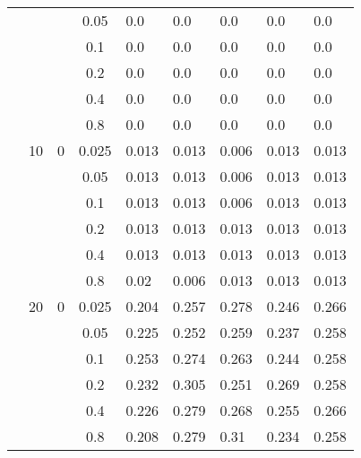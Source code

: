 \begin{longtable}{|l|l|l|c|l|l|l|l|l|}
\cmidrule{4-9} &     &          & 0.05           & 0.0        & 0.0        & 0.0        & 0.0        & 0.0        \\
\cmidrule{4-9} &     &          & 0.1            & 0.0        & 0.0        & 0.0        & 0.0        & 0.0        \\
\cmidrule{4-9} &     &          & 0.2            & 0.0        & 0.0        & 0.0        & 0.0        & 0.0        \\
\cmidrule{4-9} &     &          & 0.4            & 0.0        & 0.0        & 0.0        & 0.0        & 0.0        \\
\cmidrule{4-9} &     &          & 0.8            & 0.0        & 0.0        & 0.0        & 0.0        & 0.0        \\
\cmidrule{2-9} & 10  & 0        & 0.025          & 0.013      & 0.013      & 0.006      & 0.013      & 0.013      \\
\cmidrule{4-9} &     &          & 0.05           & 0.013      & 0.013      & 0.006      & 0.013      & 0.013      \\
\cmidrule{4-9} &     &          & 0.1            & 0.013      & 0.013      & 0.006      & 0.013      & 0.013      \\
\cmidrule{4-9} &     &          & 0.2            & 0.013      & 0.013      & 0.013      & 0.013      & 0.013      \\
\cmidrule{4-9} &     &          & 0.4            & 0.013      & 0.013      & 0.013      & 0.013      & 0.013      \\
\cmidrule{4-9} &     &          & 0.8            & 0.02       & 0.006      & 0.013      & 0.013      & 0.013      \\
\cmidrule{2-9} & 20  & 0        & 0.025          & 0.204      & 0.257      & 0.278      & 0.246      & 0.266      \\
\cmidrule{4-9} &     &          & 0.05           & 0.225      & 0.252      & 0.259      & 0.237      & 0.258      \\
\cmidrule{4-9} &     &          & 0.1            & 0.253      & 0.274      & 0.263      & 0.244      & 0.258      \\
\cmidrule{4-9} &     &          & 0.2            & 0.232      & 0.305      & 0.251      & 0.269      & 0.258      \\
\cmidrule{4-9} &     &          & 0.4            & 0.226      & 0.279      & 0.268      & 0.255      & 0.266      \\
\cmidrule{4-9} &     &          & 0.8            & 0.208      & 0.279      & 0.31       & 0.234      & 0.258      \\

\end{longtable}
